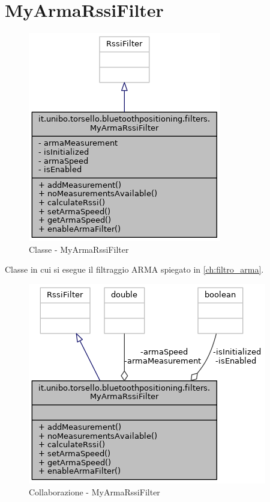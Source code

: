 \newpage
\section{MyArmaRssiFilter}
\begin{figure}[ph]
	\centering
	\includegraphics[width=0.5\linewidth]{img/uml/class/classit_1_1unibo_1_1torsello_1_1bluetoothpositioning_1_1filters_1_1MyArmaRssiFilter__inherit__graph.png}
	\caption{Classe - MyArmaRssiFilter}
\end{figure}

Classe in cui si esegue il filtraggio ARMA spiegato in \ref{ch:filtro_arma}.

\begin{figure}[ph]
	\centering
	\includegraphics[width=0.65\linewidth]{img/uml/class/classit_1_1unibo_1_1torsello_1_1bluetoothpositioning_1_1filters_1_1MyArmaRssiFilter__coll__graph.png}
	\caption{Collaborazione - MyArmaRssiFilter}
\end{figure}

\newpage
